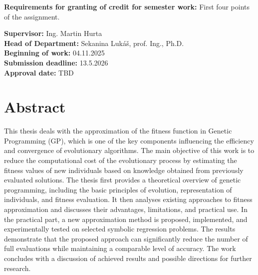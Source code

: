\documentclass[12pt,a4paper]{report}
\begin{document}
\begin{titlepage}
\begin{flushleft}
\vspace{0.5cm}
\textbf{Requirements for granting of credit for semester work:} First four points of the assignment.

\vspace{0.8cm}
\textbf{Supervisor:} Ing. Martin Hurta\\
\textbf{Head of Department:} Sekanina Lukáš, prof. Ing., Ph.D.\\
\textbf{Beginning of work:} 04.11.2025\\
\textbf{Submission deadline:} 13.5.2026\\
\textbf{Approval date:} TBD

\vfill
\end{flushleft}
\end{titlepage}

\setcounter{page}{1}

\section*{Abstract}
This thesis deals with the approximation of the fitness function in Genetic Programming (GP), which is one of the key components influencing the efficiency and convergence of evolutionary algorithms. The main objective of this work is to reduce the computational cost of the evolutionary process by estimating the fitness values of new individuals based on knowledge obtained from previously evaluated solutions.
The thesis first provides a theoretical overview of genetic programming, including the basic principles of evolution, representation of individuals, and fitness evaluation. It then analyses existing approaches to fitness approximation and discusses their advantages, limitations, and practical use.
In the practical part, a new approximation method is proposed, implemented, and experimentally tested on selected symbolic regression problems. The results demonstrate that the proposed approach can significantly reduce the number of full evaluations while maintaining a comparable level of accuracy. The work concludes with a discussion of achieved results and possible directions for further research.
\end{document}
